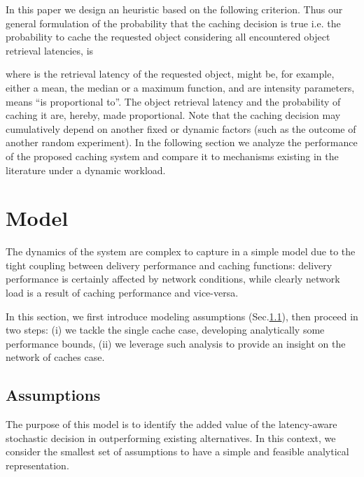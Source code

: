 \documentclass[conference]{IEEEtran}
\begin{document}
In this paper we design an heuristic based on the following 
criterion. Thus our general formulation of the probability 
that the caching decision  is true i.e. the probability 
to cache the  requested object considering all encountered object retrieval latencies, is



where   is the retrieval latency of the  
requested object,  might be, for example, either a mean, 
the median or a maximum function,  and  are 
intensity parameters,  means  ``is proportional 
to''. The object retrieval latency and the probability of 
caching it are, hereby, made proportional.  Note that the 
caching decision may cumulatively depend on another fixed or 
dynamic factors (such as the outcome of another random 
experiment).
In the following section we analyze the performance of the 
proposed caching system and compare it to mechanisms existing 
in the literature under a dynamic workload.

\section{Model}
\label{sec:system_model}
The dynamics of the system are complex to capture in a simple 
model due to the tight coupling between delivery performance 
and caching functions: delivery performance is certainly 
affected by network conditions, while clearly network load is 
a result of caching performance and vice-versa. 

In this section, we first introduce modeling assumptions 
(Sec.\ref{sec:ass}), then proceed in two steps: (i) we tackle 
the single cache case, developing analytically some performance bounds, (ii) we leverage such analysis to 
provide an insight on the network of caches case.

\subsection{Assumptions}\label{sec:ass}
The purpose of this model is to identify the added value of the latency-aware stochastic 
decision in outperforming existing alternatives.
In this context, we consider the smallest set of assumptions to have a simple and feasible 
analytical representation.
\end{document}
